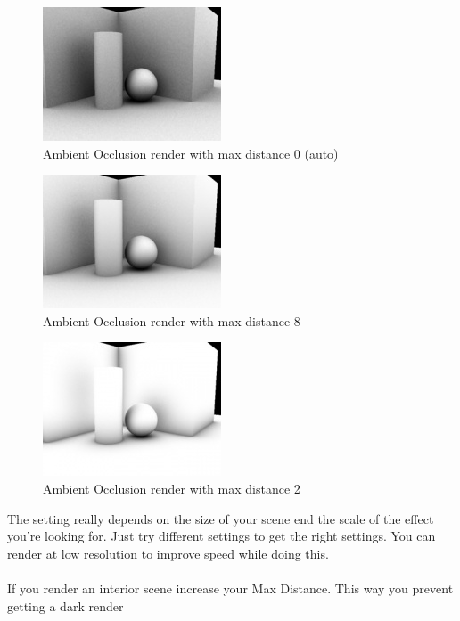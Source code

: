 \documentclass[10pt,a4paper]{article}
\begin{document}
\begin{figure}[tbh]
\centering
\includegraphics[width=0.5\linewidth]{figure/Amb_occlusion_example_distance0}
\caption{Ambient Occlusion render with max distance 0 (auto)}
\label{fig:ambocclusionexampledistance0}
\end{figure}

\begin{figure}[tbh]
\centering
\includegraphics[width=0.5\linewidth]{figure/Amb_occlusion_example_distance8}
\caption{Ambient Occlusion render with max distance 8}
\label{fig:ambocclusionexampledistance8}
\end{figure}


\begin{figure}[tbh]
\centering
\includegraphics[width=0.5\linewidth]{figure/Amb_occlusion_example_distance2}
\caption{Ambient Occlusion render with max distance 2}
\label{fig:ambocclusionexampledistance2}
\end{figure}

The setting really depends on the size of your scene end the scale of the effect you're looking for. Just try different settings to get the right settings. You can render at low resolution to improve speed while doing this.
\\
\\
If you render an interior scene increase your Max Distance. This way you prevent getting a dark render
\end{document}
